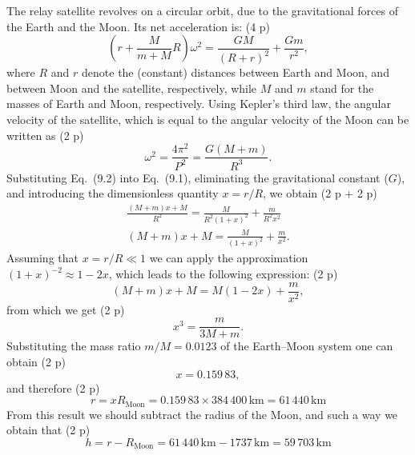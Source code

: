 The relay satellite revolves on a circular orbit, due to the gravitational
forces of the Earth and the Moon. Its net acceleration is: \hfill(4 p)
\begin{equation*}
\left(r + \frac{M}{m + M}R\right)\omega^2
  = \frac{GM}{(R + r)^2} + \frac{Gm}{r^2}, \tag{9.1}
\end{equation*}
where $R$ and $r$ denote the (constant) distances between Earth and Moon, and
between Moon and the satellite, respectively, while $M$ and $m$ stand for the
masses of Earth and Moon, respectively. Using Kepler's third law, the angular
velocity of the satellite, which is equal to the angular velocity of the Moon
can be written as \hfill(2 p)
\begin{equation*}
\omega^2 = \frac{4\pi^2}{P^2} = \frac{G(M + m)}{R^3}. \tag{9.2}
\end{equation*}
Substituting Eq.\ (9.2) into Eq.\ (9.1), eliminating the gravitational
constant ($G$), and introducing the dimensionless quantity $x = r/R$, we
obtain \hfill(2 p + 2 p)
\begin{gather*}
\frac{(M + m)x + M}{R^2} = \frac{M}{R^2(1 + x)^2} + \frac{m}{R^2 x^2}
  \tag{9.3} \\
(M + m)x + M = \frac{M}{(1 + x)^2} + \frac{m}{x^2}. \tag{9.4}
\end{gather*}
Assuming that $x = r/R \ll 1$ we can apply the approximation
$(1 + x)^{-2} \approx 1 - 2x$, which leads to the following expression:
\hfill(2 p)
\begin{equation*}
(M + m)x + M = M(1 - 2x) + \frac{m}{x^2}, \tag{9.5}
\end{equation*}
from which we get \hfill(2 p)
\begin{equation*}
x^3 = \frac{m}{3M + m}. \tag{9.6}
\end{equation*}
Substituting the mass ratio $m/M = 0.0123$ of the Earth--Moon system one can
obtain \hfill(2 p)
\begin{equation*}
x = 0.159\,83, \tag{9.7}
\end{equation*}
and therefore \hfill(2 p)
\begin{equation*}
r = xR_{\mathrm{Moon}} = 0.159\,83 \times 384\,400\,\mathrm{km}
  = 61\,440\,\mathrm{km} \tag{9.8}
\end{equation*}
From this result we should subtract the radius of the Moon, and such a way we
obtain that \hfill(2 p)
\begin{equation*}
h = r - R_{\mathrm{Moon}} = 61\,440\,\mathrm{km} - 1737\,\mathrm{km}
  = \boxed{59\,703\,\mathrm{km}} \tag{9.9}
\end{equation*}

